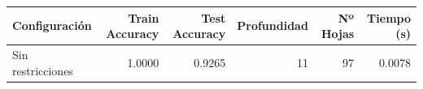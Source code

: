 \begin{tabular}{lrrrrr}
\toprule
Configuración & Train Accuracy & Test Accuracy & Profundidad & Nº Hojas & Tiempo (s) \\
\midrule
Sin restricciones & 1.0000 & 0.9265 & 11 & 97 & 0.0078 \\
\bottomrule
\end{tabular}
